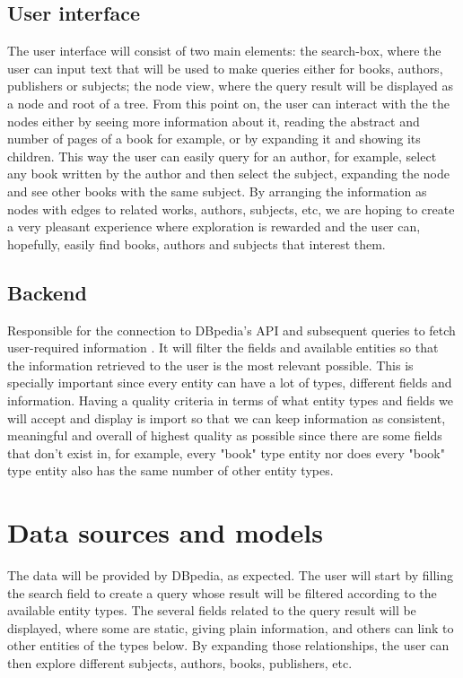 \documentclass[twocolumn,twoside,11pt,a4paper]{article}
\begin{document}
\subsection{User interface} \label{userinterface} 

The user interface will consist of two main elements: the search-box, where the user can input text that will be used to make queries either for books, authors, publishers or subjects; the node view, where the query result will be displayed as a node and root of a tree. From this point on, the user can interact  with the the nodes either by seeing more information about it, reading the abstract and number of pages of a book for example, or by expanding it and showing its children. This way the user can easily query for an author, for example, select any book written by the author and then select the subject, expanding the node and see other books with the same subject.
By arranging the information as nodes with edges to related works, authors, subjects, etc, we are hoping to create a very pleasant experience where exploration is rewarded and the user can, hopefully, easily find books, authors and subjects that interest them.

\subsection{Backend} \label{backend} 

Responsible for the connection to DBpedia’s API and subsequent queries to fetch user-required information \cite{dbpedia}. It will filter the fields and available entities so that the information retrieved to the user is the most relevant possible. This is specially important since every entity can have a lot of types, different fields and information. Having a quality criteria in terms of what entity types and fields we will accept and display is import so that we can keep information as consistent, meaningful and overall of highest quality as possible since there are some fields that don't exist in, for example, every "book" type entity nor does every "book" type entity also has the same number of other entity types.


\section{Data sources and models}\label{sec:data}

The data will be provided by DBpedia, as expected. The user will start by filling the search field to create a query whose result will be filtered according to the available entity types. The several fields related to the query result will be displayed, where some are static, giving plain information, and others can link to other entities of the types below. By expanding those relationships, the user can then explore different subjects, authors, books, publishers, etc.
\end{document}
